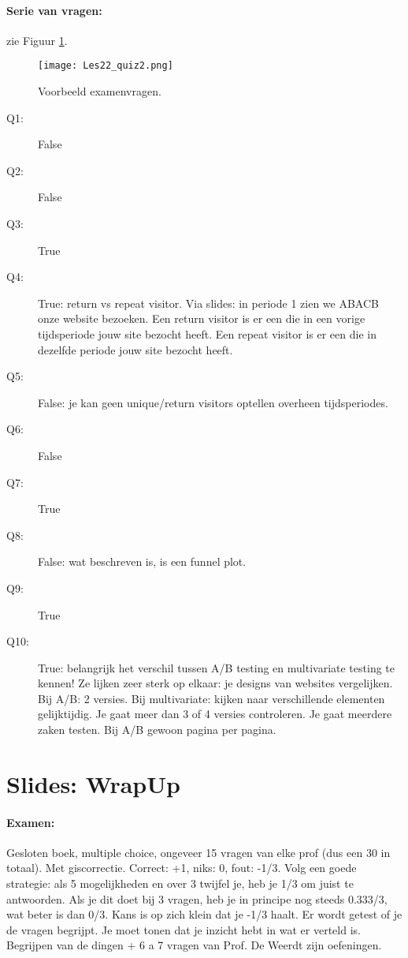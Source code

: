 \documentclass[10pt,a4paper]{report}
\begin{document}
\paragraph{Serie van vragen:} zie Figuur \ref{Les22_2}.

\begin{figure}[ht!]
\centering
\texttt{[image: Les22\_quiz2.png]}
\caption{Voorbeeld examenvragen. \label{Les22_2}}
\end{figure}

\begin{description}
\item[Q1:]False
\item[Q2:]False
\item[Q3:]True
\item[Q4:]True: return vs repeat visitor. Via slides: in periode 1 zien we ABACB onze website bezoeken. Een return visitor is er een die in een vorige tijdsperiode jouw site bezocht heeft. Een repeat visitor is er een die in dezelfde periode jouw site bezocht heeft.
\item[Q5:]False: je kan geen unique/return visitors optellen overheen tijdsperiodes.
\item[Q6:]False
\item[Q7:]True
\item[Q8:]False: wat beschreven is, is een funnel plot.
\item[Q9:]True
\item[Q10:]True: belangrijk het verschil tussen A/B testing en multivariate testing te kennen! Ze lijken zeer sterk op elkaar: je designs van websites vergelijken. Bij A/B: 2 versies. Bij multivariate: kijken naar verschillende elementen gelijktijdig. Je gaat meer dan 3 of 4 versies controleren. Je gaat meerdere zaken testen. Bij A/B gewoon pagina per pagina.
\end{description}

\section{Slides: WrapUp}

\paragraph{Examen:}
Gesloten boek, multiple choice, ongeveer 15 vragen van elke prof (dus een 30 in totaal). Met giscorrectie. Correct: +1, niks: 0, fout: -1/3. Volg een goede strategie: als 5 mogelijkheden en over 3 twijfel je, heb je 1/3 om juist te antwoorden. Als je dit doet bij 3 vragen, heb je in principe nog steeds 0.333/3, wat beter is dan 0/3. Kans is op zich klein dat je -1/3 haalt.
Er wordt getest of je de vragen begrijpt. Je moet tonen dat je inzicht hebt in wat er verteld is. Begrijpen van de dingen + 6 a 7 vragen van Prof. De Weerdt zijn oefeningen.
\end{document}
